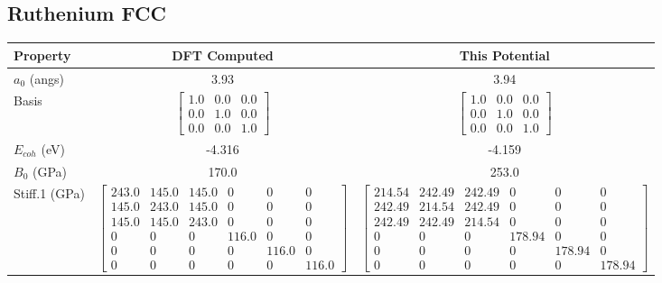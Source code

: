 
\clearpage
\FloatBarrier
\subsection{Ruthenium FCC}

\begin{table}[ht]
\renewcommand{\arraystretch}{1.2}
\begin{tabular}{lcccccc}
\hline\hline
Property & \multicolumn{3}{c}{DFT Computed} & \multicolumn{3}{c}{This Potential} \\
\hline\hline
$a_0$ (angs)         & \multicolumn{3}{c}{3.93}   & \multicolumn{3}{c}{3.94} \\
Basis            & \multicolumn{3}{c}{$\begin{bmatrix} 1.0 & 0.0 & 0.0 \\ 0.0 & 1.0 & 0.0 \\ 0.0 & 0.0 & 1.0  \end{bmatrix}$} & \multicolumn{3}{c}{$\begin{bmatrix} 1.0 & 0.0 & 0.0 \\ 0.0 & 1.0 & 0.0 \\ 0.0 & 0.0 & 1.0  \end{bmatrix}$} \\
$E_{coh}$ (eV)           & \multicolumn{3}{c}{-4.316}  & \multicolumn{3}{c}{-4.159} \\
$B_0$ (GPa)              & \multicolumn{3}{c}{170.0}  & \multicolumn{3}{c}{253.0} \\
Stiff.1 (GPa) & \multicolumn{3}{c}{$\begin{bmatrix} 243.0 & 145.0 & 145.0 & 0 & 0 & 0 \\ 145.0 & 243.0 & 145.0 & 0 & 0 & 0 \\ 145.0 & 145.0 & 243.0 & 0 & 0 & 0 \\ 0 & 0 & 0 & 116.0 & 0 & 0 \\ 0 & 0 & 0 & 0 & 116.0 & 0 \\ 0 & 0 & 0 & 0 & 0 & 116.0 \end{bmatrix}$}   & \multicolumn{3}{c}{$\begin{bmatrix} 214.54 & 242.49 & 242.49 & 0 & 0 & 0 \\ 242.49 & 214.54 & 242.49 & 0 & 0 & 0 \\ 242.49 & 242.49 & 214.54 & 0 & 0 & 0 \\ 0 & 0 & 0 & 178.94 & 0 & 0 \\ 0 & 0 & 0 & 0 & 178.94 & 0 \\ 0 & 0 & 0 & 0 & 0 & 178.94 \end{bmatrix}$} \\

\end{tabular}
\end{table}
